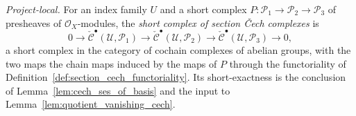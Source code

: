 \begin{definition}

  \label{def:section_cech_short_complex}
  \textit{Project-local.}
  For an index family \(U\) and a short complex
  \(P : \mathcal{P}_1 \to \mathcal{P}_2 \to \mathcal{P}_3\) of presheaves of
  \(\mathcal{O}_X\)-modules, the \emph{short complex of section {\v C}ech complexes} is
  \[
    0 \to \check{\mathcal{C}}^\bullet(\mathcal{U}, \mathcal{P}_1) \to
      \check{\mathcal{C}}^\bullet(\mathcal{U}, \mathcal{P}_2) \to
      \check{\mathcal{C}}^\bullet(\mathcal{U}, \mathcal{P}_3) \to 0,
  \]
  a short complex in the category of cochain complexes of abelian groups, with the two maps the
  chain maps induced by the maps of \(P\) through the functoriality of
  Definition~\ref{def:section_cech_functoriality}. Its short-exactness is the conclusion of
  Lemma~\ref{lem:cech_ses_of_basis} and the input to Lemma~\ref{lem:quotient_vanishing_cech}.
\end{definition}

